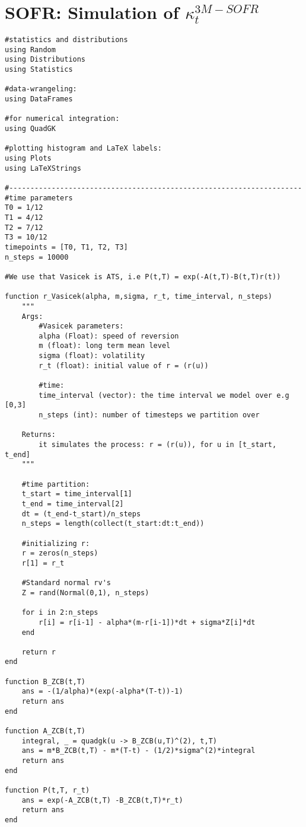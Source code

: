 \section{SOFR: Simulation of $\kappa_{t}^{3M-SOFR}$}
\begin{verbatim}
#statistics and distributions
using Random 
using Distributions
using Statistics

#data-wrangeling:
using DataFrames

#for numerical integration:
using QuadGK

#plotting histogram and LaTeX labels:
using Plots 
using LaTeXStrings

#---------------------------------------------------------------------
#time parameters
T0 = 1/12
T1 = 4/12
T2 = 7/12
T3 = 10/12
timepoints = [T0, T1, T2, T3]
n_steps = 10000

#We use that Vasicek is ATS, i.e P(t,T) = exp(-A(t,T)-B(t,T)r(t))

function r_Vasicek(alpha, m,sigma, r_t, time_interval, n_steps)
    """
    Args: 
        #Vasicek parameters:
        alpha (Float): speed of reversion 
        m (float): long term mean level 
        sigma (float): volatility 
        r_t (float): initial value of r = (r(u))
        
        #time:
        time_interval (vector): the time interval we model over e.g [0,3]
        n_steps (int): number of timesteps we partition over
    
    Returns: 
        it simulates the process: r = (r(u)), for u in [t_start, t_end]
    """

    #time partition: 
    t_start = time_interval[1]
    t_end = time_interval[2]
    dt = (t_end-t_start)/n_steps
    n_steps = length(collect(t_start:dt:t_end))

    #initializing r: 
    r = zeros(n_steps)
    r[1] = r_t

    #Standard normal rv's
    Z = rand(Normal(0,1), n_steps)

    for i in 2:n_steps
        r[i] = r[i-1] - alpha*(m-r[i-1])*dt + sigma*Z[i]*dt
    end

    return r
end

function B_ZCB(t,T)
    ans = -(1/alpha)*(exp(-alpha*(T-t))-1)
    return ans
end

function A_ZCB(t,T)
    integral, _ = quadgk(u -> B_ZCB(u,T)^(2), t,T)
    ans = m*B_ZCB(t,T) - m*(T-t) - (1/2)*sigma^(2)*integral 
    return ans
end

function P(t,T, r_t)
    ans = exp(-A_ZCB(t,T) -B_ZCB(t,T)*r_t)
    return ans
end


\end{verbatim}
